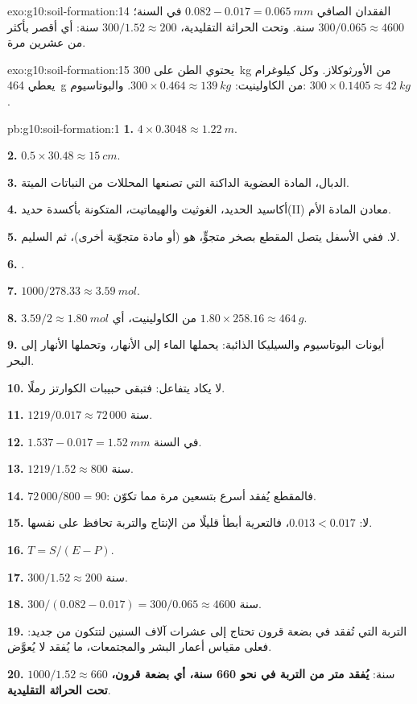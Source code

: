 \begin{solution}{exo:g10:soil-formation:14}
الفقدان الصافي $0.082 - 0.017 = \qty{0.065}{mm}$ في السنة؛ $300/0.065 \approx 4600$
سنة. وتحت الحراثة التقليدية، $300/1.52 \approx 200$ سنة: أي أقصر بأكثر من
عشرين مرة.
\end{solution}

\begin{solution}{exo:g10:soil-formation:15}
يحتوي الطن على \qty{300}{kg} من الأورثوكلاز. وكل كيلوغرام يعطي
\qty{464}{g} من الكاولينيت: $300 \times 0.464 \approx \qty{139}{kg}$. والبوتاسيوم:
$300 \times 0.1405 \approx \qty{42}{kg}$.
\end{solution}

\begin{solution}{pb:g10:soil-formation:1}
\textbf{1.} $4 \times 0.3048 \approx \qty{1.22}{m}$.

\textbf{2.} $0.5 \times 30.48 \approx \qty{15}{cm}$.

\textbf{3.} الدبال، المادة العضوية الداكنة التي تصنعها المحللات من النباتات
الميتة.

\textbf{4.} أكاسيد الحديد، الغوثيت والهيماتيت، المتكونة بأكسدة حديد(II) معادن
المادة الأم.

\textbf{5.} لا. ففي الأسفل يتصل المقطع بصخر متجوٍّ، هو  (أو مادة متجوّية
أخرى)، ثم 
السليم.

\textbf{6.} .

\textbf{7.} $1000/278.33 \approx \qty{3.59}{mol}$.

\textbf{8.} $3.59/2 \approx \qty{1.80}{mol}$ من الكاولينيت، أي $1.80 \times 258.16
\approx \qty{464}{g}$.

\textbf{9.} أيونات البوتاسيوم والسيليكا الذائبة: يحملها الماء إلى الأنهار، وتحملها
الأنهار إلى البحر.

\textbf{10.} لا يكاد يتفاعل: فتبقى حبيبات الكوارتز رملًا.

\textbf{11.} $1219/0.017 \approx 72\,000$ سنة.

\textbf{12.} $1.537 - 0.017 = \qty{1.52}{mm}$ في السنة.

\textbf{13.} $1219/1.52 \approx 800$ سنة.

\textbf{14.} $72\,000/800 = 90$: فالمقطع يُفقد أسرع بتسعين مرة مما
تكوّن.

\textbf{15.} لا: $0.013 < 0.017$، فالتعرية أبطأ قليلًا من الإنتاج والتربة تحافظ على
نفسها.

\textbf{16.} $T = S/(E - P)$.

\textbf{17.} $300/1.52 \approx 200$ سنة.

\textbf{18.} $300/(0.082 - 0.017) = 300/0.065 \approx 4600$ سنة.

\textbf{19.} التربة التي تُفقد في بضعة قرون تحتاج إلى عشرات آلاف السنين لتتكون من
جديد: فعلى مقياس أعمار البشر والمجتمعات، ما يُفقد لا يُعوَّض.

\textbf{20.} $1000/1.52 \approx 660$ سنة: \textbf{يُفقد متر من التربة
في نحو 660 سنة، أي بضعة قرون، تحت الحراثة التقليدية}.
\end{solution}
